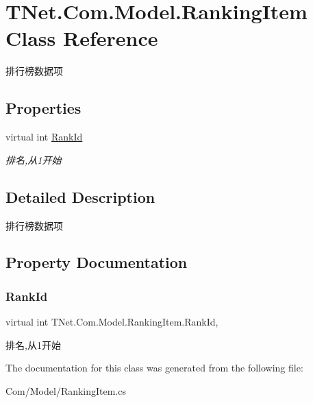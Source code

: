 \hypertarget{class_t_net_1_1_com_1_1_model_1_1_ranking_item}{}\section{T\+Net.\+Com.\+Model.\+Ranking\+Item Class Reference}
\label{class_t_net_1_1_com_1_1_model_1_1_ranking_item}


排行榜数据项  


\subsection*{Properties}
\begin{DoxyCompactItemize}
\item 
virtual int \mbox{\hyperlink{class_t_net_1_1_com_1_1_model_1_1_ranking_item_a41103ca660bdb52474072197e70d56da}{Rank\+Id}}
\begin{DoxyCompactList}\small\item\em 排名,从1开始 \end{DoxyCompactList}\end{DoxyCompactItemize}


\subsection{Detailed Description}
排行榜数据项 



\subsection{Property Documentation}
\mbox{\label{class_t_net_1_1_com_1_1_model_1_1_ranking_item_a41103ca660bdb52474072197e70d56da}} 
\subsubsection{\texorpdfstring{Rank\+Id}{RankId}}
{\footnotesize\ttfamily virtual int T\+Net.\+Com.\+Model.\+Ranking\+Item.\+Rank\+Id\hspace{0.3cm}{\ttfamily [get]}, {\ttfamily [set]}}



排名,从1开始 



The documentation for this class was generated from the following file\+:\begin{DoxyCompactItemize}
\item 
Com/\+Model/Ranking\+Item.\+cs\end{DoxyCompactItemize}
